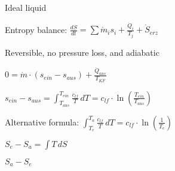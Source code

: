 Ideal liquid  

Entropy balance:  
\( \frac{dS}{dt} = \sum \dot{m}_i s_i + \frac{\dot{Q}_i}{T_j} + \dot{S}_{erz} \)  

Reversible, no pressure loss, and adiabatic  

\( 0 = \dot{m} \cdot (s_{ein} - s_{aus}) + \frac{\dot{Q}_{aus}}{T_{KF}} \)  

\( s_{ein} - s_{aus} = \int_{T_{aus}}^{T_{ein}} \frac{c_{lf}}{T} \, dT = c_{lf} \cdot \ln \left( \frac{T_{ein}}{T_{aus}} \right) \)  

Alternative formula:  
\( \int_{T_e}^{T_a} \frac{c_{lf}}{T} \, dT = c_{lf} \cdot \ln \left( \frac{1}{T_e} \right) \)  

\( S_e - S_a = \int T \, dS \)  

\( S_a - S_e \)